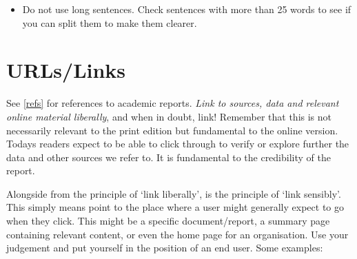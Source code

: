 \documentclass[
]{book}
\providecommand{\tightlist}{%
  \setlength{\itemsep}{0pt}\setlength{\parskip}{0pt}}
\begin{document}
\begin{itemize}
\tightlist
\item
  Do not use long sentences. Check sentences with more than 25 words to see if you can split them to make them clearer.
\end{itemize}

\hypertarget{urls}{%
\section{URLs/Links}\label{urls}}

See \ref{refs} for references to academic reports. \emph{Link to sources, data and
relevant online material liberally}, and when in doubt, link! Remember that this
is not necessarily relevant to the print edition but fundamental to the online
version. Todays readers expect to be able to click through to verify or explore
further the data and other sources we refer to. It is fundamental to the
credibility of the report.

Alongside from the principle of `link liberally', is the principle of `link
sensibly'. This simply means point to the place where a user might generally
expect to go when they click. This might be a specific document/report, a
summary page containing relevant content, or even the home page for an
organisation. Use your judgement and put yourself in the position of an end
user. Some examples:
\end{document}
